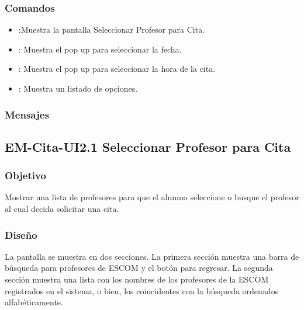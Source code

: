 \subsubsection{Comandos}
\begin{itemize}
	\item {}:Muestra la pantalla Seleccionar Profesor para Cita.
	\item {}: Muestra el pop up para seleccionar la fecha.
	\item {}: Muestra el pop up para seleccionar la hora de 
	la cita.
	\item {}: Muestra un listado de opciones.
\end{itemize}

\subsubsection{Mensajes}
\begin{Citemize}
	\item {}
	\item {}
\end{Citemize}

\pagebreak

\subsection{EM-Cita-UI2.1 Seleccionar Profesor para Cita }

\subsubsection{Objetivo}
	\noindent
	Mostrar una lista de profesores para que el alumno seleccione o busque el profesor al cual decida solicitar una cita.

\subsubsection{Diseño}
	\noindent
	La pantalla se muestra en dos secciones. La primera sección muestra una barra de búsqueda para profesores de ESCOM y el botón para regresar. La segunda sección muestra una lista con los nombres de los profesores de la ESCOM registrados en el sistema, o bien, los coincidentes con la búsqueda ordenados alfabéticamente. 

